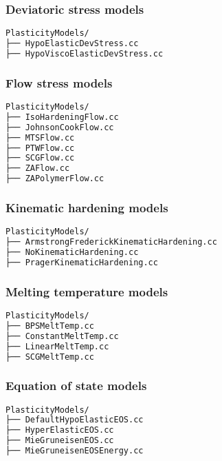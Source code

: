 \subsubsection{Deviatoric stress models}
\begin{lstlisting}[language=sh, backgroundcolor=\color{background}]
PlasticityModels/
├── HypoElasticDevStress.cc
├── HypoViscoElasticDevStress.cc
\end{lstlisting}

\subsubsection{Flow stress models}
\begin{lstlisting}[language=sh, backgroundcolor=\color{background}]
PlasticityModels/
├── IsoHardeningFlow.cc
├── JohnsonCookFlow.cc
├── MTSFlow.cc
├── PTWFlow.cc
├── SCGFlow.cc
├── ZAFlow.cc
├── ZAPolymerFlow.cc
\end{lstlisting}

\subsubsection{Kinematic hardening models}
\begin{lstlisting}[language=sh, backgroundcolor=\color{background}]
PlasticityModels/
├── ArmstrongFrederickKinematicHardening.cc
├── NoKinematicHardening.cc
├── PragerKinematicHardening.cc
\end{lstlisting}

\subsubsection{Melting temperature models}
\begin{lstlisting}[language=sh, backgroundcolor=\color{background}]
PlasticityModels/
├── BPSMeltTemp.cc
├── ConstantMeltTemp.cc
├── LinearMeltTemp.cc
├── SCGMeltTemp.cc
\end{lstlisting}

\subsubsection{Equation of state models}
\begin{lstlisting}[language=sh, backgroundcolor=\color{background}]
PlasticityModels/
├── DefaultHypoElasticEOS.cc
├── HyperElasticEOS.cc
├── MieGruneisenEOS.cc
├── MieGruneisenEOSEnergy.cc
\end{lstlisting}

